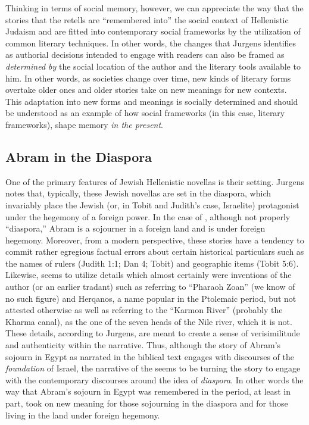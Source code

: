 Thinking in terms of social memory, however, we can appreciate the way that the stories that the \ga retells are ``remembered into'' the social context of Hellenistic Judaism and are fitted into contemporary social frameworks by the utilization of common literary techniques. In other words, the changes that Jurgens identifies as authorial decisions intended to engage with readers can also be framed as \emph{determined by} the social location of the author and the literary tools available to him. In other words, as societies change over time, new kinds of literary forms overtake older ones and older stories take on new meanings for new contexts. This adaptation into new forms and meanings is socially determined and should be understood as an example of how social frameworks (in this case, literary frameworks), shape memory \emph{in the present}.

\subsection{Abram in the Diaspora}

One of the primary features of Jewish Hellenistic novellas is their setting. Jurgens notes that, typically, these Jewish novellas are set in the diaspora, which invariably place the Jewish (or, in Tobit and Judith's case, Israelite) protagonist under the hegemony of a foreign power. In the case of \ga, although not properly ``diaspora,'' Abram is a sojourner in a foreign land and is under foreign hegemony. Moreover, from a modern perspective, these stories have a tendency to commit rather egregious factual errors about certain historical particulars such as the names of rulers (Judith 1:1; Dan 4; Tobit) and geographic items (Tobit 5:6). Likewise, \ga seems to utilize details which almost certainly were inventions of the author (or an earlier tradant) such as referring to ``Pharaoh Zoan'' (we know of no such figure) and Herqanos, a name popular in the Ptolemaic period, but not attested otherwise as well as referring to the ``Karmon River'' (probably the Kharma canal), as the one of the seven heads of the Nile river, which it is not.\autocites[7]{jurgens_jsj2018}[See also][50--59]{machiela_as2010}[197--199]{fitzmyer2004} These details, according to Jurgens, are meant to create a sense of verisimilitude and authenticity within the narrative. Thus, although the story of Abram's sojourn in Egypt as narrated in the biblical text engages with discourses of the \emph{foundation} of Israel, the narrative of the \ga seems to be turning the story to engage with the contemporary discourses around the idea of \emph{diaspora}. In other words the way that Abram's sojourn in Egypt was remembered in the \secondtemple period, at least in part, took on new meaning for those sojourning in the diaspora and for those living in the land under foreign hegemony.

